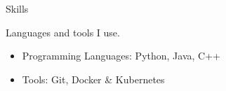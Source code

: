 \documentclass{resume}
\begin{document}
    \begin{rSection}{Skills}
    
        Languages and tools I use.\begin{itemize}[leftmargin=0em, label={}, noitemsep]
    
    \item {Programming Languages:} \hfill {Python, Java, C++}
    \item {Tools:} \hfill {Git, Docker \& Kubernetes}
    \end{itemize}
    \end{rSection}
\end{document}
